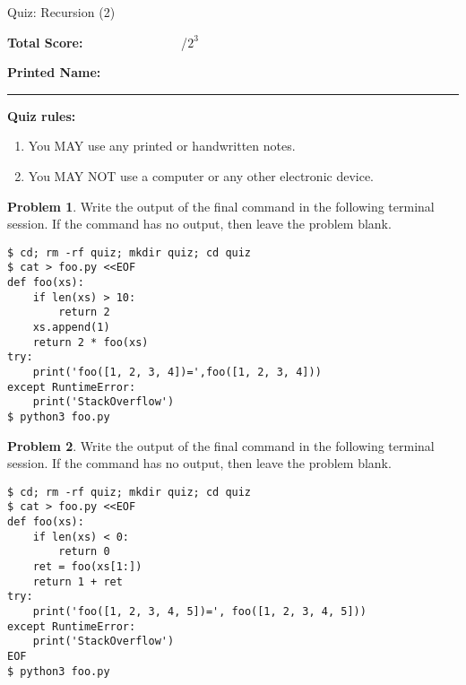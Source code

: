 \documentclass[10pt]{article}
\theoremstyle{definition}
\newtheorem{problem}{Problem}
\begin{document}
\begin{center}
    {
\Large
    Quiz: Recursion (2)
}


    \vspace{0.1in}
\end{center}

\vspace{0.15in}
\noindent
\textbf{Total Score:} ~~~~~~~~~~~~~~~/$2^3$

\vspace{0.2in}
\noindent
\textbf{Printed Name:}

\noindent
\rule{\textwidth}{0.1pt}
\vspace{0.15in}

\noindent
\textbf{Quiz rules:}
\begin{enumerate}
    \item You MAY use any printed or handwritten notes.
    \item You MAY NOT use a computer or any other electronic device.
\end{enumerate}

\noindent

\vspace{0.15in}

\begin{problem}
    Write the output of the final command in the following terminal session.
    If the command has no output, then leave the problem blank.
\end{problem}
\begin{lstlisting}
$ cd; rm -rf quiz; mkdir quiz; cd quiz
$ cat > foo.py <<EOF
def foo(xs):
    if len(xs) > 10:
        return 2
    xs.append(1)
    return 2 * foo(xs)
try:
    print('foo([1, 2, 3, 4])=',foo([1, 2, 3, 4]))
except RuntimeError:
    print('StackOverflow')
$ python3 foo.py
\end{lstlisting}

\newpage
\begin{problem}
    Write the output of the final command in the following terminal session.
    If the command has no output, then leave the problem blank.
\end{problem}
\begin{lstlisting}
$ cd; rm -rf quiz; mkdir quiz; cd quiz
$ cat > foo.py <<EOF
def foo(xs):
    if len(xs) < 0:
        return 0
    ret = foo(xs[1:])
    return 1 + ret
try:
    print('foo([1, 2, 3, 4, 5])=', foo([1, 2, 3, 4, 5]))
except RuntimeError:
    print('StackOverflow')
EOF
$ python3 foo.py
\end{lstlisting}
\end{document}
